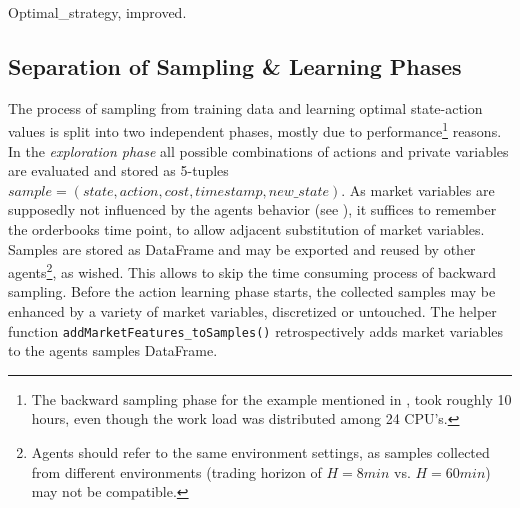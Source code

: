 \begin{algorithm}[H] 
 \caption{Optimal\_strategy, improved.}
     \SetAlgoLined
     \footnotesize
     

\label{alg:bruteforceimproved:pseudocode}
\end{algorithm}





\subsection{Separation of Sampling \& Learning Phases}
The process of sampling from training data and learning optimal state-action values is split into two independent phases, mostly due to performance\footnote{The backward sampling phase for the example mentioned in , took roughly 10 hours, even though the work load was distributed among 24 CPU's.} reasons. In the \emph{exploration phase} all possible combinations of actions and private variables are evaluated and stored as 5-tuples $sample=(state, action, cost, timestamp, new\_state)$. As market variables are supposedly not influenced by the agents behavior (see ), it suffices to remember the orderbooks time point, to allow adjacent substitution of market variables.\\

Samples are stored as DataFrame and may be exported and reused by other agents\footnote{Agents should refer to the same environment settings, as samples collected from different environments (\eg trading horizon of $H=8min$ vs. $H=60min$) may not be compatible.}, as wished. This allows to skip the time consuming process of backward sampling. Before the action learning phase starts, the collected samples may be enhanced by a variety of market variables, discretized or untouched. The helper function \lstinline!addMarketFeatures_toSamples()! retrospectively adds market variables to the agents samples DataFrame.\\

